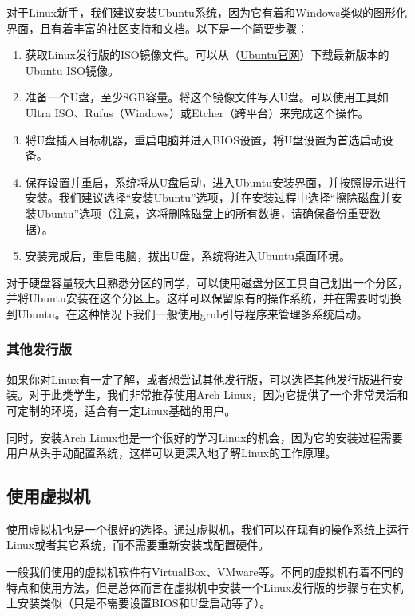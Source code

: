 \documentclass[../main.tex]{subfiles}
\begin{document}
对于Linux新手，我们建议安装Ubuntu系统，因为它有着和Windows类似的图形化界面，且有着丰富的社区支持和文档。以下是一个简要步骤：

\begin{enumerate}
  \item 获取Linux发行版的ISO镜像文件。可以从（\href{https://ubuntu.com/download}{Ubuntu官网}）下载最新版本的Ubuntu ISO镜像。
  \item 准备一个U盘，至少8GB容量。将这个镜像文件写入U盘。可以使用工具如Ultra ISO、Rufus（Windows）或Etcher（跨平台）来完成这个操作。
  \item 将U盘插入目标机器，重启电脑并进入BIOS设置，将U盘设置为首选启动设备。
  \item 保存设置并重启，系统将从U盘启动，进入Ubuntu安装界面，并按照提示进行安装。我们建议选择“安装Ubuntu”选项，并在安装过程中选择“擦除磁盘并安装Ubuntu”选项（注意，这将删除磁盘上的所有数据，请确保备份重要数据）。
  \item 安装完成后，重启电脑，拔出U盘，系统将进入Ubuntu桌面环境。
\end{enumerate}

对于硬盘容量较大且熟悉分区的同学，可以使用磁盘分区工具自己划出一个分区，并将Ubuntu安装在这个分区上。这样可以保留原有的操作系统，并在需要时切换到Ubuntu。在这种情况下我们一般使用grub引导程序来管理多系统启动。

\subsubsection{其他发行版}

如果你对Linux有一定了解，或者想尝试其他发行版，可以选择其他发行版进行安装。对于此类学生，我们非常推荐使用Arch Linux，因为它提供了一个非常灵活和可定制的环境，适合有一定Linux基础的用户。

同时，安装Arch Linux也是一个很好的学习Linux的机会，因为它的安装过程需要用户从头手动配置系统，这样可以更深入地了解Linux的工作原理。

\subsection{使用虚拟机}

使用虚拟机也是一个很好的选择。通过虚拟机，我们可以在现有的操作系统上运行Linux或者其它系统，而不需要重新安装或配置硬件。

一般我们使用的虚拟机软件有VirtualBox、VMware等。不同的虚拟机有着不同的特点和使用方法，但是总体而言在虚拟机中安装一个Linux发行版的步骤与在实机上安装类似（只是不需要设置BIOS和U盘启动等了）。
\end{document}

